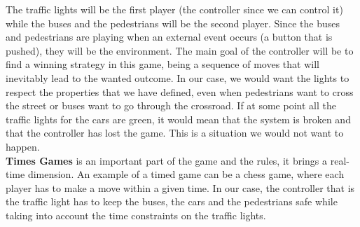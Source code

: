 The traffic lights will be the first player (the controller since we can control it) while the buses and the pedestrians will be the second player. Since the buses and pedestrians are playing when an external event occurs (a button that is pushed), they will be the environment. The main goal of the controller will be to find a winning strategy in this game, being a sequence of moves that will inevitably lead to the wanted outcome. In our case, we would want the lights to respect the properties that we have defined, even when pedestrians want to cross the street or buses want to go through the crossroad. If at some point all the traffic lights for the cars are green, it would mean that the system is broken and that the controller has lost the game. This is a situation we would not want to happen. \\

\textbf{Times Games} is an important part of the game and the rules, it brings a real-time dimension. An example of a timed game can be a chess game, where each player has to make a move within a given time. In our case, the controller that is the traffic light has to keep the buses, the cars and the pedestrians safe while taking into account the time constraints on the traffic lights.
